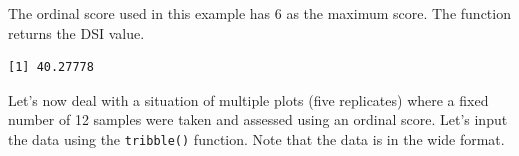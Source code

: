 \documentclass[
  letterpaper,
]{book}
\newenvironment{Shaded}{\begin{snugshade}}{\end{snugshade}}
\newcommand{\DecValTok}[1]{\textcolor[rgb]{0.68,0.00,0.00}{#1}}
\newcommand{\FunctionTok}[1]{\textcolor[rgb]{0.28,0.35,0.67}{#1}}
\newcommand{\NormalTok}[1]{\textcolor[rgb]{0.00,0.23,0.31}{#1}}
\newcommand{\SpecialCharTok}[1]{\textcolor[rgb]{0.37,0.37,0.37}{#1}}
\begin{document}
The ordinal score used in this example has 6 as the maximum score. The
function returns the DSI value.

\begin{Shaded}
\end{Shaded}

\begin{verbatim}
[1] 40.27778
\end{verbatim}

Let's now deal with a situation of multiple plots (five replicates)
where a fixed number of 12 samples were taken and assessed using an
ordinal score. Let's input the data using the \texttt{tribble()}
function. Note that the data is in the wide format.
\end{document}
